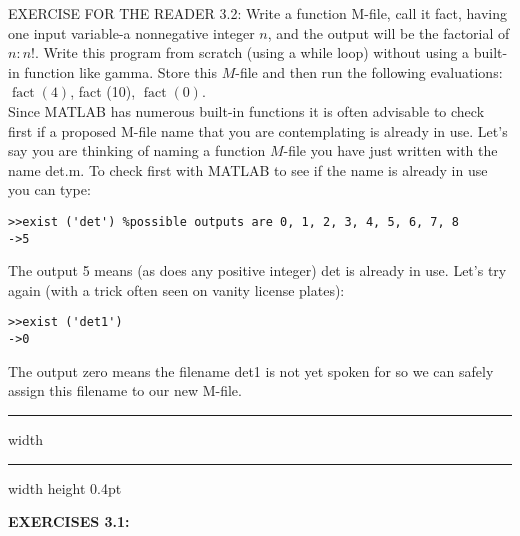 \documentclass[../main.tex]{subfiles}
\begin{document}
EXERCISE FOR THE READER 3.2: Write a function M-file, call it fact, having one input variable-a nonnegative integer $n$, and the output will be the factorial of $n: n !$. Write this program from scratch (using a while loop) without using a built-in function like gamma. Store this $M$-file and then run the following evaluations: $\operatorname{fact}(4)$, fact (10), $\operatorname{fact}(0)$.\\

Since MATLAB has numerous built-in functions it is often advisable to check first if a proposed M-file name that you are contemplating is already in use. Let's say you are thinking of naming a function $M$-file you have just written with the name det.m. To check first with MATLAB to see if the name is already in use you can type:


\begin{verbatim}
>>exist ('det') %possible outputs are 0, 1, 2, 3, 4, 5, 6, 7, 8
->5
\end{verbatim}

The output 5 means (as does any positive integer) det is already in use. Let's try again (with a trick often seen on vanity license plates):

\begin{verbatim}
>>exist ('det1')
->0
\end{verbatim}


The output zero means the filename det1 is not yet spoken for so we can safely assign this filename to our new M-file.

\hrule width \hsize \kern 1pt \hrule width \hsize height 0.4pt

\hspace{0.1cm}

\textbf{EXERCISES 3.1: }
\end{document}

